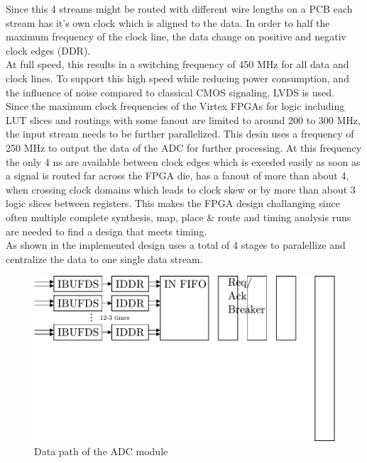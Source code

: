 Since this 4 streams might be routed with different wire lengths on a \gls{PCB}
each stream has it's own clock which is aligned to the data.
In order to half the maximum frequency of the clock line,
the data change on positive and negativ clock edges (\gls{DDR}). \\

At full speed, this results in a switching frequency of 450 MHz for all data
and clock lines. To support this high speed while reducing power consumption,
and the influence of noise compared to classical \gls{CMOS} signaling,
\gls{LVDS} is used. \\

Since the maximum clock frequencies of the Virtex \glspl{FPGA} for logic
including \gls{LUT} slices and routings with some fanout
are limited to around 200 to 300 MHz, the input stream needs to be further
parallelized. This desin uses a frequency of 250 MHz to output
the data of the \gls{ADC} for further processing. At this frequency
the only 4 ns are available between clock edges which is exeeded easily
as soon as a signal is routed far across the \gls{FPGA} die,
has a fanout of more than about 4, when crossing clock domains which leads
to clock skew or by more than about 3 logic slices between registers.
This makes the \gls{FPGA} design challanging since often multiple
complete synthesis, map, place \& route and timing analysis runs are
needed to find a design that meets timing. \\

As shown in  the implemented design uses
a total of 4 stages to paralellize and centralize the data to
one single data stream. \\

\begin{figure}[ht]
  \centering
  \includegraphics[width=\textwidth]{figures/fpga_adc}
  \caption{Data path of the \gls{ADC} module}
  \label{fig:fpga_adc}
\end{figure}

